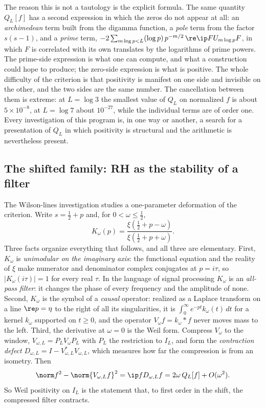 The reason this is not a tautology is the explicit formula. The same quantity
$Q_L[f]$ has a second expression in which the zeros do not appear at all: an
\emph{archimedean} term built from the digamma function, a \emph{pole} term
from the factor $s(s-1)$, and a \emph{prime} term,
$-2\sum_{m\log p<L}(\log p)\,p^{-m/2}\,\re\ip F{U_{m\log p}F}$, in which $F$ is
correlated with its own translates by the logarithms of prime powers. The
prime-side expression is what one can compute, and what a construction could
hope to produce; the zero-side expression is what is positive. The whole
difficulty of the criterion is that positivity is manifest on one side and
invisible on the other, and the two sides are the same number. The cancellation
between them is extreme: at $L=\log 3$ the smallest value of $Q_L$ on
normalized $f$ is about $5\times10^{-8}$, at $L=\log 7$ about
$10^{-27}$, while the individual terms are of order one. Every investigation of
this program is, in one way or another, a search for a presentation of $Q_L$ in
which positivity is structural and the arithmetic is nevertheless present.

\subsection{The shifted family: RH as the stability of a filter}

The Wilson-lines investigation \cite{WilsonLines} studies a one-parameter
deformation of the criterion. Write $s=\frac12+p$ and, for $0<\omega\leq\frac12$,
\begin{equation}\label{eq:intro-transfer}
 K_\omega(p)=\frac{\xi(\tfrac12+p-\omega)}{\xi(\tfrac12+p+\omega)} .
\end{equation}
Three facts organize everything that follows, and all three are elementary.
First, $K_\omega$ is \emph{unimodular on the imaginary axis}: the functional
equation and the reality of $\xi$ make numerator and denominator complex
conjugates at $p=i\tau$, so $|K_\omega(i\tau)|=1$ for every real $\tau$. In the
language of signal processing $K_\omega$ is an \emph{all-pass filter}: it
changes the phase of every frequency and the amplitude of none. Second,
$K_\omega$ is the symbol of a \emph{causal} operator: realized as a Laplace
transform on a line $\re p=\eta$ to the right of all its singularities, it is
$\int_0^\infty e^{-pt}k_\omega(t)\,dt$ for a kernel $k_\omega$ supported on
$t\geq0$, and the operator $V_\omega f=k_\omega*f$ never moves mass to the left.
Third, the derivative at $\omega=0$ is the Weil form. Compress $V_\omega$ to the
window, $V_{\omega,L}=P_LV_\omega P_L$ with $P_L$ the restriction to $I_L$, and
form the \emph{contraction defect} $D_{\omega,L}=I-V_{\omega,L}^*V_{\omega,L}$,
which measures how far the compression is from an isometry. Then
\begin{equation}\label{eq:intro-firstorder}
 \norm f^2-\norm{V_{\omega,L}f}^2=\ip f{D_{\omega,L}f}=2\omega\,Q_L[f]+O(\omega^2).
\end{equation}
So Weil positivity on $I_L$ is the statement that, to first order in the shift,
the compressed filter contracts.

